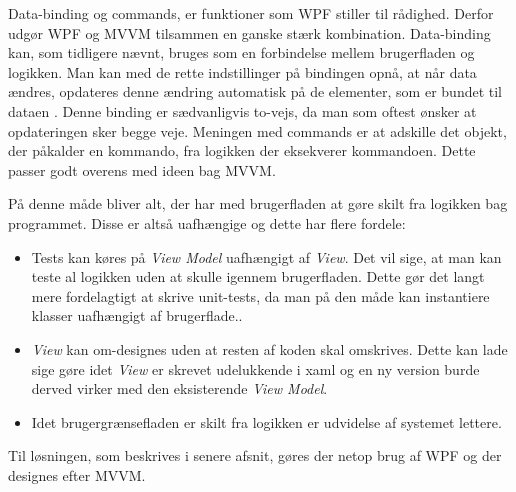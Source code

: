 Data-binding og commands, er  funktioner som WPF stiller til rådighed. Derfor udgør WPF og MVVM tilsammen en ganske stærk kombination. Data-binding kan, som tidligere nævnt, bruges som en forbindelse mellem brugerfladen og logikken. Man kan med de rette indstillinger på bindingen opnå, at når data ændres, opdateres denne ændring automatisk på de elementer, som er bundet til dataen \cite{msdn-databinding}. Denne binding er sædvanligvis to-vejs, da man som oftest ønsker at opdateringen sker begge veje. 
Meningen med commands er at adskille det objekt, der påkalder en kommando, fra logikken der eksekverer kommandoen. Dette passer godt overens med ideen bag MVVM. 

På denne måde bliver alt, der har med brugerfladen at gøre skilt fra logikken bag programmet. Disse er altså uafhængige og dette har flere fordele:

\begin{itemize}

\item {Tests kan køres på \textit{View Model} uafhængigt af \textit{View}.}
Det vil sige, at man kan teste al logikken uden at skulle igennem brugerfladen. Dette gør det langt mere fordelagtigt at skrive unit-tests, da man på den måde kan instantiere klasser uafhængigt af brugerflade..
\item{\textit{View} kan om-designes uden at resten af koden skal omskrives.}
Dette kan lade sige gøre idet \textit{View} er skrevet udelukkende i xaml og en ny version burde derved virker med den eksisterende \textit{View Model}.
\item{Idet brugergrænsefladen er skilt fra logikken er udvidelse af systemet lettere.\cite{msdn1}}

\end{itemize}

Til løsningen, som beskrives i senere afsnit, gøres der netop brug af WPF og der designes efter MVVM. 

